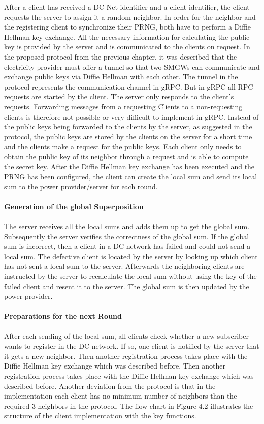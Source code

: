 After a client has received a DC Net identifier and a client identifier, the client requests the server to assign it a random neighbor. In order for the neighbor and the registering client to synchronize their PRNG, both have to perform a Diffie Hellman key exchange. All the necessary information for calculating the public key is provided by the server and is communicated to the clients on request. In the proposed protocol from the previous chapter, it was described that the electricity provider must offer a tunnel so that two SMGWs can communicate and exchange public keys via Diffie Hellman with each other. The tunnel in the protocol represents the communication channel in gRPC. But in gRPC all RPC requests are started by the client. The server only responds to the client's requests. Forwarding messages from a requesting Clients to a non-requesting clients is therefore not possible or very difficult to implement in gRPC. Instead of the public keys being forwarded to the clients by the server, as suggested in the protocol, the public keys are stored by the clients on the server for a short time and the clients make a request for the public keys. 
Each client only needs to obtain the public key of its neighbor through a request and is able to compute the secret key. After the Diffie Hellman key exchange has been executed and the PRNG has been configured, the client can create the local sum and send its local sum to the power provider/server for each round. 
\\
\\
\textbf{Generation of the global Superposition}
\\
\\
The server receives all the local sums and adds them up to get the global sum. Subsequently the server verifies the correctness of the global sum. If the global sum is incorrect, then a client in a DC network has failed and could not send a local sum. The defective client is located by the server by looking up which client has not sent a local sum to the server. Afterwards the neighboring clients are instructed by the server to recalculate the local sum without using the key of the failed client and resent it to the server. The global sum is then updated by the power provider. \\
\\
\textbf{Preparations for the next Round}
\\
\\
After each sending of the local sum, all clients check whether a new subscriber wants to register in the DC network. If so, one client is notified by the server that it gets a new neighbor. Then another registration process takes place with the Diffie Hellman key exchange which was described before. Then another registration process takes place with the Diffie Hellman key exchange which was described before. Another deviation from the protocol is that in the implementation each client has no minimum number of neighbors than the required 3 neighbors in the protocol. The flow chart in Figure 4.2 illustrates the structure of the client implementation with the key functions.
